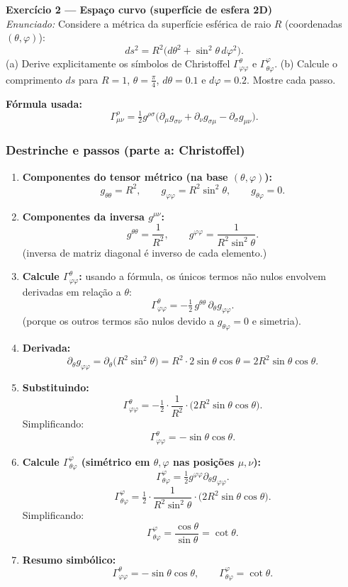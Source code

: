 \documentclass[11pt]{article}
\begin{document}
\vspace{8pt}
\noindent\textbf{Exercício 2 — Espaço curvo (superfície de esfera 2D)}\\
\textit{Enunciado:} Considere a métrica da superfície esférica de raio \(R\) (coordenadas \((\theta,\varphi)\)):
\[
ds^2 = R^2\big(d\theta^2 + \sin^2\theta\,d\varphi^2\big).
\]
(a) Derive explicitamente os símbolos de Christoffel \(\Gamma^\theta_{\varphi\varphi}\) e \(\Gamma^\varphi_{\theta\varphi}\). (b) Calcule o comprimento \(ds\) para \(R=1\), \(\theta=\tfrac{\pi}{4}\), \(d\theta=0.1\) e \(d\varphi=0.2\). Mostre cada passo.

\medskip
\textbf{Fórmula usada:} 
\[
\Gamma^\rho_{\mu\nu} = \tfrac{1}{2}g^{\rho\sigma}\big(\partial_\mu g_{\sigma\nu}+\partial_\nu g_{\sigma\mu}-\partial_\sigma g_{\mu\nu}\big).
\]

\subsubsection*{Destrinche e passos (parte a: Christoffel)}
\begin{enumerate}
  \item \textbf{Componentes do tensor métrico (na base \((\theta,\varphi)\)):}
  \[
    g_{\theta\theta} = R^2,\qquad g_{\varphi\varphi} = R^2\sin^2\theta,\qquad g_{\theta\varphi}=0.
  \]
  \item \textbf{Componentes da inversa \(g^{\mu\nu}\):}
  \[
    g^{\theta\theta} = \frac{1}{R^2},\qquad g^{\varphi\varphi} = \frac{1}{R^2\sin^2\theta}.
  \]
  (inversa de matriz diagonal é inverso de cada elemento.)
  \item \textbf{Calcule \(\Gamma^\theta_{\varphi\varphi}\):} usando a fórmula, os únicos termos não nulos envolvem derivadas em relação a \(\theta\):
  \[
    \Gamma^\theta_{\varphi\varphi} = -\tfrac{1}{2}\,g^{\theta\theta}\,\partial_\theta g_{\varphi\varphi}.
  \]
  (porque os outros termos são nulos devido a \(g_{\theta\varphi}=0\) e simetria).
  \item \textbf{Derivada:}
  \[
    \partial_\theta g_{\varphi\varphi} = \partial_\theta\big(R^2\sin^2\theta\big) = R^2\cdot 2\sin\theta\cos\theta = 2R^2\sin\theta\cos\theta.
  \]
  \item \textbf{Substituindo:}
  \[
    \Gamma^\theta_{\varphi\varphi} = -\tfrac{1}{2}\cdot\frac{1}{R^2}\cdot\big(2R^2\sin\theta\cos\theta\big).
  \]
  Simplificando:
  \[
    \Gamma^\theta_{\varphi\varphi} = -\sin\theta\cos\theta.
  \]
  \item \textbf{Calcule \(\Gamma^\varphi_{\theta\varphi}\) (simétrico em \(\theta,\varphi\) nas posições \(\mu,\nu\)):}
  \[
    \Gamma^\varphi_{\theta\varphi} = \tfrac{1}{2}g^{\varphi\varphi}\partial_\theta g_{\varphi\varphi}.
  \]
  \[
    \Gamma^\varphi_{\theta\varphi} = \tfrac{1}{2}\cdot\frac{1}{R^2\sin^2\theta}\cdot\big(2R^2\sin\theta\cos\theta\big).
  \]
  Simplificando:
  \[
    \Gamma^\varphi_{\theta\varphi} = \frac{\cos\theta}{\sin\theta} = \cot\theta.
  \]
  \item \textbf{Resumo simbólico:}
  \[
    \boxed{\Gamma^\theta_{\varphi\varphi} = -\sin\theta\cos\theta,\qquad \Gamma^\varphi_{\theta\varphi} = \cot\theta.}
  \]
\end{enumerate}
\end{document}
